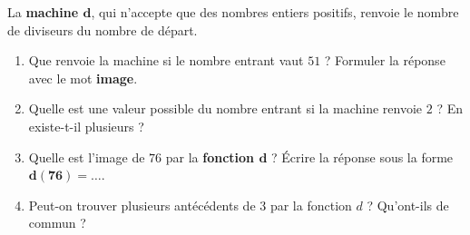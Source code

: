 \begin{exercice}
    La \textbf{machine $\boldsymbol{d}$}, qui n'accepte que des nombres entiers positifs, renvoie le nombre de diviseurs du nombre de départ.
    \begin{center}
    \end{center}
    \vspace*{-5mm} 
    \begin{enumerate}
        \item Que renvoie la machine si le nombre entrant vaut $51$ ? Formuler la réponse avec le mot \textbf{image}.
        \item Quelle est une valeur possible du nombre entrant si la machine renvoie  $2$ ? En existe-t-il plusieurs ?
        \item Quelle est l'image de $76$ par la \textbf{fonction $\boldsymbol{d}$} ? Écrire la réponse sous la forme $\boldsymbol{d(76)=\ldots}$.
        \item Peut-on trouver plusieurs antécédents de 3 par la fonction $d$ ? Qu'ont-ils de commun ?
    \end{enumerate}
\end{exercice}
